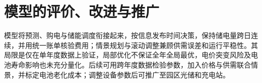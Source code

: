 \section{模型的评价、改进与推广}
模型将预测、购电与储能调度衔接起来，按信息发布时间决策，保持储电量跨日连续，并用统一账单核验费用；情景规划与滚动调整兼顾供需误差和运行平稳性。其局限是仅在单年度数据上验证，局部优化不保证全年全局最优，电价突变风险及电池寿命影响也未充分量化。后续可用跨年度数据检验参数，加入价格与供需联合情景，并标定电池老化成本；调整设备参数后可推广至园区光储和充电站。

